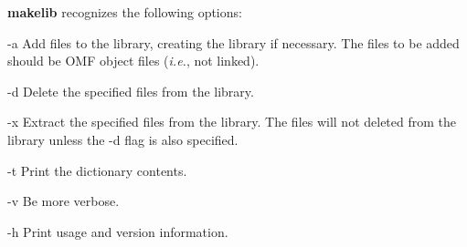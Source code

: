 \documentclass{article}
\def\makelib{\textbf{makelib} }
\begin{document}

\makelib recognizes the following options:
\begin{optionlist}
	\item [-a]	
	Add files to the library, creating the library if necessary.  The files to be added should be
	OMF object files (\textit{i.e.}, not linked).
	\item [-d]
	Delete the specified files from the library.
	\item [-x]
	Extract the specified files from the library.  The files will not deleted from the library
	unless the -d flag is also specified.
	\item [-t] 
	Print the dictionary contents.  
	\item [-v]
	Be more verbose.
	\item [-h]
	Print usage and version information.
\end{optionlist}
\end{document}
